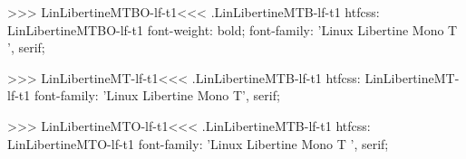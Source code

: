 {{{{{{{>>>
\<LinLibertineMTBO-lf-t1\><<<
.LinLibertineMTB-lf-t1
htfcss:  LinLibertineMTBO-lf-t1  font-weight: bold; font-family: 'Linux Libertine Mono T ', serif;

>>>
\<LinLibertineMT-lf-t1\><<<
.LinLibertineMTB-lf-t1
htfcss:  LinLibertineMT-lf-t1  font-family: 'Linux Libertine Mono T', serif;

>>>
\<LinLibertineMTO-lf-t1\><<<
.LinLibertineMTB-lf-t1
htfcss:  LinLibertineMTO-lf-t1  font-family: 'Linux Libertine Mono T ', serif;

}}}}}}}
